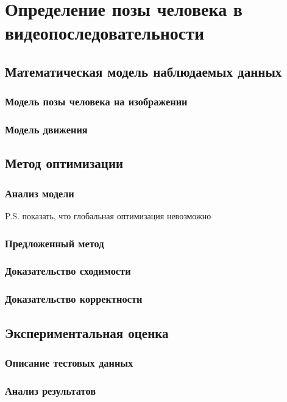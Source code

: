 \chapter{Определение позы человека в видеопоследовательности} \label{chapt6}
\section{Математическая модель наблюдаемых данных}
\subsection{Модель позы человека на изображении}
\subsection{Модель движения}
\section{Метод оптимизации}
\subsection{Анализ модели} P.S. показать, что глобальная оптимизация невозможно
\subsection{Предложенный метод}
\subsection{Доказательство сходимости}
\subsection{Доказательство корректности}
\section{Экспериментальная оценка}
\subsection{Описание тестовых данных}
\subsection{Анализ результатов}
